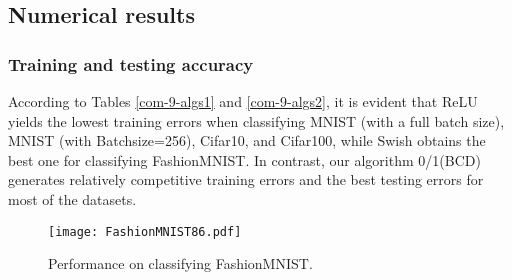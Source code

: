 \documentclass[journal]{IEEEtran}
\begin{document}
{
\subsection{Numerical results}
\subsubsection{Training and testing accuracy} According to Tables \ref{com-9-algs1} and  \ref{com-9-algs2}, it is evident that ReLU yields the lowest training errors when classifying MNIST (with a full batch size), MNIST (with Batchsize=256), Cifar10, and Cifar100, while Swish obtains  the best one for classifying FashionMNIST. In contrast, our algorithm 0/1(BCD) generates relatively competitive training errors and the best testing errors for most of the datasets. 
  
  \begin{figure*}[!t]
\centering
\texttt{[image: FashionMNIST86.pdf]}
\caption{Performance on classifying FashionMNIST.}
\label{fig:Fashion}\vspace{-3mm}
\end{figure*}



}
\end{document}

